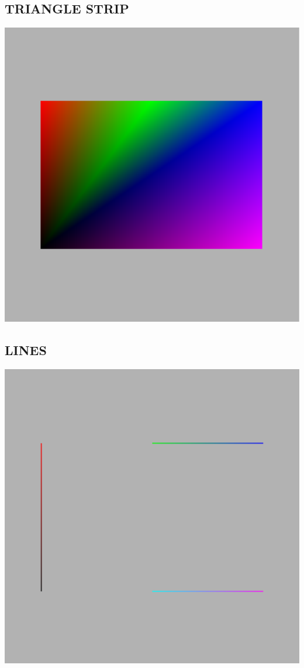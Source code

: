\documentclass{report}
\begin{document}
\subsection{TRIANGLE STRIP}
\includegraphics[width=1.0\textwidth]{Image_3}
\subsection{LINES}
\includegraphics[width=1.0\textwidth]{Image_4}
\end{document}
